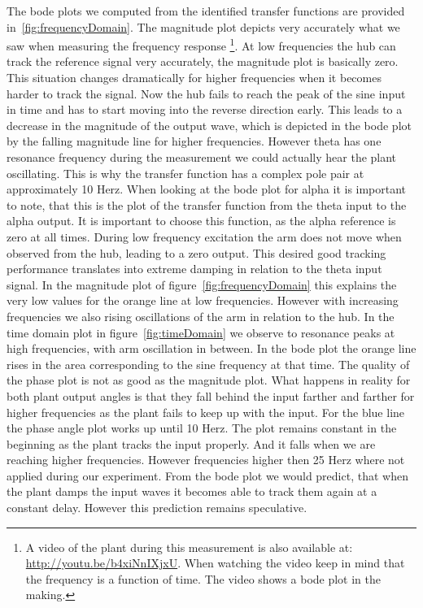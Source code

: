 \documentclass[ twoside,openright,titlepage,numbers=noenddot,headinclude,%
                footinclude=true,cleardoublepage=empty,abstractoff, %
                BCOR=5mm,paper=a4,fontsize=11pt,%
                ngerman,american,%
                ]{scrreprt}
\begin{document}
{The bode plots we computed from the identified transfer functions are provided in~\ref{fig:frequencyDomain}. The magnitude plot depicts very accurately what we saw when measuring the frequency response \footnote{A video of the plant during this measurement is also available at: \url{http://youtu.be/b4xiNnIXjxU}. When watching the video keep in mind that the frequency is a function of time. The video shows a bode plot in the making.}. At low frequencies the hub can track the reference signal very accurately, the magnitude plot is basically zero. This situation changes dramatically for higher frequencies when it becomes harder to track the signal. Now the hub fails to reach the peak of the sine input in time and has to start moving into the reverse direction early. This leads to a decrease in the magnitude of the output wave, which is depicted in the bode plot by the falling magnitude line for  higher frequencies. However theta has one resonance frequency during the measurement we could actually hear the plant oscillating. This is why the transfer function has a complex pole pair at approximately 10 Herz. 
When looking at the bode plot for alpha it is important to note, that this is the plot of the transfer function from the theta input to the alpha output. It is important to choose this function, as the alpha reference is zero at all times. During low frequency excitation the arm does not move when observed from the hub, leading to a zero output. This desired good tracking performance translates into extreme damping in relation to the theta input signal. In the magnitude plot of figure~\ref{fig:frequencyDomain} this explains the very low values for the orange line at low frequencies. However with increasing frequencies we also rising oscillations of the arm in relation to the hub. In the time domain plot in figure~\ref{fig:timeDomain} we observe to resonance peaks at high frequencies, with arm oscillation in between. In the bode plot the orange line rises in the area corresponding to the sine frequency at that time. 
The quality of the phase plot is not as good as the magnitude plot. What happens in reality for both plant output angles is that they fall behind the input farther and farther for higher frequencies as the plant fails to keep up with the input. For the blue line the phase angle plot works up until 10 Herz. The plot remains constant in the beginning as the plant tracks the input properly. And it falls when we are reaching higher frequencies. However frequencies higher then 25 Herz where not applied during our experiment. From the bode plot we would predict, that when the plant damps the input waves it becomes able to track them again at a constant delay. However this prediction remains speculative.   

}
\end{document}
